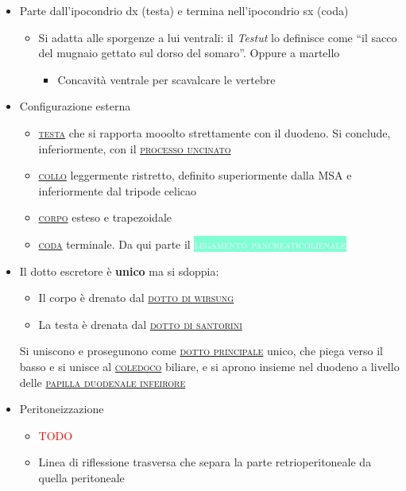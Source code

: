 \documentclass[italian,]{article}
\providecommand{\tightlist}{%
  \setlength{\itemsep}{0pt}\setlength{\parskip}{0pt}}
\newcommand{\tol}[1]{\colorbox{Aquamarine}{\textcolor{white}{\textsc{#1}}}}
\renewcommand{\a}[1]{\underline{\textsc{#1}}}
\newcommand{\TODO}[1]{\textcolor{red}{\textsf{\footnotesize{TODO #1}}}} %
\begin{document}
\begin{itemize}
\tightlist
\item
  Parte dall'ipocondrio dx (testa) e termina nell'ipocondrio sx (coda)

  \begin{itemize}
  \tightlist
  \item
    Si adatta alle sporgenze a lui ventrali: il \emph{Testut} lo
    definisce come ``il sacco del mugnaio gettato sul dorso del
    somaro''. Oppure a martello

    \begin{itemize}
    \tightlist
    \item
      Concavità ventrale per scavalcare le vertebre
    \end{itemize}
  \end{itemize}
\item
  Configurazione esterna

  \begin{itemize}
  \tightlist
  \item
    \a{testa} che si rapporta mooolto strettamente con il duodeno. Si
    conclude, inferiormente, con il \a{processo uncinato}
  \item
    \a{collo} leggermente ristretto, definito superiormente dalla MSA e
    inferiormente dal tripode celicao
  \item
    \a{corpo} esteso e trapezoidale
  \item
    \a{coda} terminale. Da qui parte il
    \tol{legamento pancreaticolienale}
  \end{itemize}
\item
  Il dotto escretore è \textbf{unico} ma si sdoppia:

  \begin{itemize}
  \tightlist
  \item
    Il corpo è drenato dal \a{dotto di wirsung}
  \item
    La testa è drenata dal \a{dotto di santorini}
  \end{itemize}

  Si uniscono e prosegunono come \a{dotto principale} unico, che piega
  verso il basso e si unisce al \a{coledoco} biliare, e si aprono
  insieme nel duodeno a livello delle \a{papilla duodenale infeirore}
\item
  Peritoneizzazione

  \begin{itemize}
  \item
    \TODO{}
  \item
    Linea di riflessione trasversa che separa la parte retrioperitoneale
    da quella peritoneale
  \end{itemize}
\end{itemize}
\end{document}

